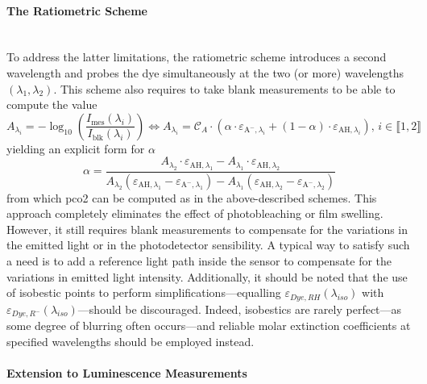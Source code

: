\paragraph{The Ratiometric Scheme}\label{subsect:choos:dye_based:optical_schemes:ratiometric}\mbox{}\\

To address the latter limitations, the ratiometric scheme introduces a second wavelength and probes the dye simultaneously at the two (or more) wavelengths $(\lambda_1, \lambda_2)$. This scheme also requires to take blank measurements to be able to compute the value
\begin{equation}
	A_{\lambda_i} = - \log_{10}\left( \frac{I_\text{mes}(\lambda_i)}{I_\text{blk}(\lambda_i)}\right) \iff A_{\lambda_i} = \mathcal{C}_A \cdot \left( \alpha \cdot \varepsilon_{\text{A}^-,\lambda_i} + (1-\alpha) \cdot \varepsilon_{\text{AH},\lambda_i} \right) \text{, }i\in \llbracket 1, 2\rrbracket
\end{equation}
yielding an explicit form for $\alpha$
\begin{equation}
	\alpha = \frac{A_{\lambda_2} \cdot \varepsilon_{\text{AH},\lambda_1} - A_{\lambda_1} \cdot \varepsilon_{\text{AH},\lambda_2}}{A_{\lambda_2} (\varepsilon_{\text{AH},\lambda_1} - \varepsilon_{\text{A}^-,\lambda_1}) - A_{\lambda_1} (\varepsilon_{\text{AH},\lambda_2} - \varepsilon_{\text{A}^-,\lambda_2})}
\end{equation}
from which \gls{pco2} can be computed as in the above-described schemes. This approach completely eliminates the effect of photobleaching or film swelling. However, it still requires blank measurements to compensate for the variations in the emitted light or in the photodetector sensibility. A typical way to satisfy such a need is to add a reference light path inside the sensor to compensate for the variations in emitted light intensity\cite{ge2014}. Additionally, it should be noted that the use of isobestic points to perform simplifications---equalling $\varepsilon_{Dye, RH}(\lambda_{iso})$ with $\varepsilon_{Dye, R^-}(\lambda_{iso})$\cite{lakowicz1993}---should be discouraged. Indeed, isobestics are rarely perfect---as some degree of blurring often occurs\cite{mills2009, segawa2003}---and reliable molar extinction coefficients at specified wavelengths should be employed instead.

\paragraph{Extension to Luminescence Measurements}\mbox{}\\

